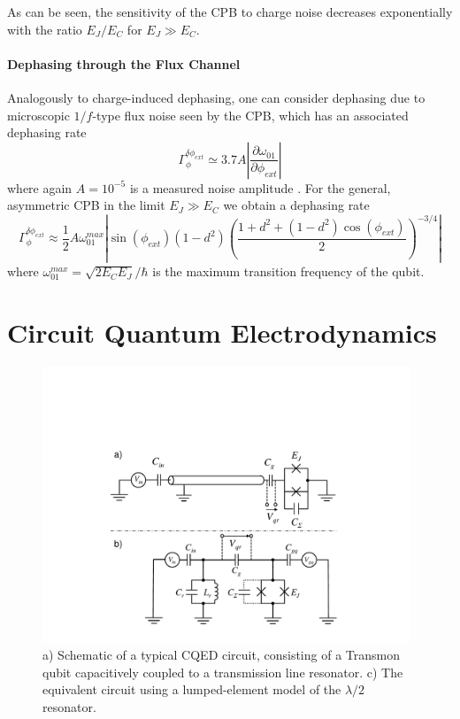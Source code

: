 As can be seen, the sensitivity of the CPB to charge noise decreases exponentially with the ratio $E_J/E_C$ for $E_J \gg E_C$.

\paragraph{Dephasing through the Flux Channel}

Analogously to charge-induced dephasing, one can consider dephasing due to microscopic $1/f$-type flux noise seen by the CPB, which has an associated dephasing rate
%
\begin{equation}
\Gamma_\phi^{\delta \phi_{ext}} \simeq 3.7A\left|\frac{\partial \omega_{01}}{\partial \phi_{ext}}\right| \label{eq:flux_dephasing_rate}
\end{equation}
%
where again $A=10^{-5}$ is a measured noise amplitude \citep{koch_charge-insensitive_2007}. For the general, asymmetric CPB in the limit $E_J \gg E_C$ we obtain a dephasing rate
%
\begin{equation}
\Gamma_\phi^{\delta \phi_{ext}} \approx \frac{1}{2} A \omega_{01}^{max}\left|\sin{(\phi_{ext})}(1-d^2)\left(\frac{1+d^2+(1-d^2)\cos{(\phi_{ext})}}{2}\right)^{-3/4}\right|
\end{equation}
%
where $\omega_{01}^{max}= \sqrt{2 E_C E_J}/\hbar$ is the maximum transition frequency of the qubit.

\section{Circuit Quantum Electrodynamics} \label{section:cqed}

\begin{figure}
	\includegraphics[width=11cm]{"./material/figures/introduction/cqed/cqed"}
	\caption{a) Schematic of a typical CQED circuit, consisting of a Transmon qubit capacitively coupled to a transmission line resonator. c) The equivalent circuit using a lumped-element model of the $\lambda/2$ resonator.}
	\label{fig:CQED}
\end{figure}

